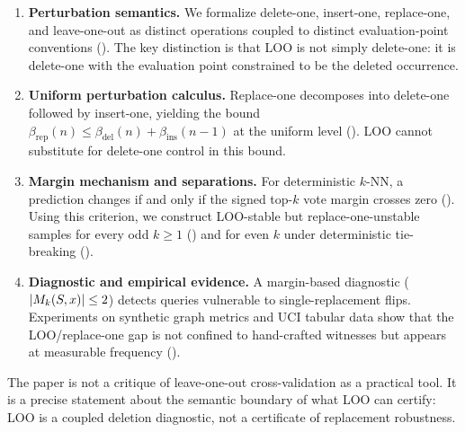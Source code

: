 \begin{enumerate}[leftmargin=*,label=(\arabic*)]
    \item \textbf{Perturbation semantics.}  We formalize delete-one,
        insert-one, replace-one, and leave-one-out as distinct operations
        coupled to distinct evaluation-point conventions
        ().  The key distinction is that LOO
        is not simply delete-one: it is delete-one with the evaluation point
        constrained to be the deleted occurrence.
    \item \textbf{Uniform perturbation calculus.}  Replace-one decomposes into
        delete-one followed by insert-one, yielding the bound
        $\beta_{\mathrm{rep}}(n) \le \beta_{\mathrm{del}}(n) +
        \beta_{\mathrm{ins}}(n-1)$ at the uniform level
        ().  LOO cannot substitute for delete-one
        control in this bound.
    \item \textbf{Margin mechanism and separations.}  For deterministic $k$-NN,
        a prediction changes if and only if the signed top-$k$ vote margin
        crosses zero ().  Using this criterion, we
        construct LOO-stable but replace-one-unstable samples for every odd $k
        \ge 1$ () and for even $k$ under
        deterministic tie-breaking ().
    \item \textbf{Diagnostic and empirical evidence.}  A margin-based
        diagnostic ($|M_k(S,x)| \le 2$) detects queries vulnerable to
        single-replacement flips.  Experiments on synthetic graph metrics and
        UCI tabular data show that the LOO/replace-one gap is not confined to
        hand-crafted witnesses but appears at measurable frequency
        ().
\end{enumerate}

\noindent The paper is not a critique of leave-one-out cross-validation as a
practical tool.  It is a precise statement about the semantic boundary of what
LOO can certify: LOO is a coupled deletion diagnostic, not a certificate of
replacement robustness.
